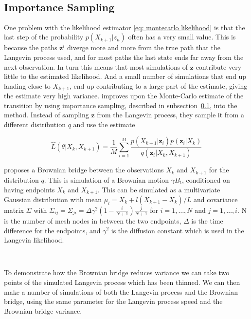\

\subsection{Importance Sampling}
\label{subsec: importance sampling}
One problem with the likelihood estimator \eqref{eq: montecarlo likelihood} is that the last step of the probability $p(X_{k+1}|z_n)$ often has a very small value. This is because the paths $\textbf{z}^i$ diverge more and more from the true path that the Langevin process used, and for most paths the last state ends far away from the next observation. In turn this means that most simulations of $\textbf{z}$ contribute very little to the estimated likelihood. And a small number of simulations that end up landing close to $X_{k+1}$, end up contributing to a large part of the estimate, giving the estimate very high variance. \parencite{durham_numerical_2002} improves upon the Monte-Carlo estimate of the transition by using importance sampling, described in subsection~\ref{subsec: importance sampling}, into the method. Instead of sampling $\textbf{z}$ from the Langevin process, they sample it from a different distribution $q$ and use the estimate

\begin{equation}
\hat{L}(\theta|X_k, X_{k+1}) = \frac{1}{M}\sum_{i=1}^M \frac{p(X_{k+1}|\textbf{z}_i)p(\textbf{z}_i|X_k)}{q(\textbf{z}_i|X_k, X_{k+1})}
\label{eq: importance sampling likelihood}
\end{equation}


\parencite{durham_numerical_2002} proposes a Brownian bridge between the observations $X_k$ and $X_{k+1}$ for the distribution $q$. This is simulation of a Brownian motion $\gamma B_t$, conditioned on having endpoints $X_k$ and $X_{k+1}$. This can be simulated as a multivariate Gaussian distribution with mean $\mu_l = X_k + l(X_{k+1}-X_k)/L$ and covariance matrix $\Sigma$ with $\Sigma_{ij} = \Sigma_{ji}= \Delta \gamma^2(1-\frac{i}{N+1}) \frac{j}{N+1}$ for $i = 1, \dots , N$ and $j = 1, \dots, i$. N is the number of mesh nodes in between the two endpoints, $\Delta$ is the time difference for the endpoints, and $\gamma^2$ is the diffusion constant which is used in the Langevin likelihood.

\

To demonstrate how the Brownian bridge reduces variance we can take two points of the simulated Langevin process which has been thinned. We can then make a number of simulations of both the Langevin process and the Brownian bridge, using the same parameter for the Langevin process speed and the Brownian bridge variance.

